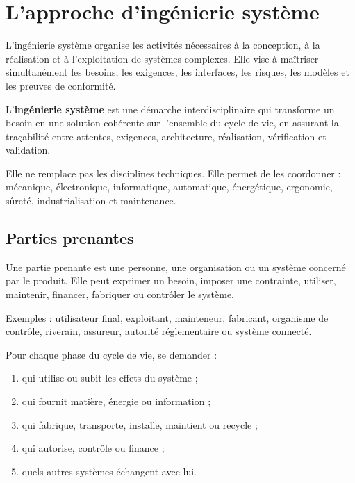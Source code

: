 
\section{L'approche d'ingénierie système}\label{sec:is-demarche}

L'ingénierie système organise les activités nécessaires à la conception, à la réalisation et à l'exploitation de systèmes complexes. Elle vise à maîtriser simultanément les besoins, les exigences, les interfaces, les risques, les modèles et les preuves de conformité.

\begin{ISdefinition}
L'\textbf{ingénierie système} est une démarche interdisciplinaire qui transforme un besoin en une solution cohérente sur l'ensemble du cycle de vie, en assurant la traçabilité entre attentes, exigences, architecture, réalisation, vérification et validation.
\end{ISdefinition}

Elle ne remplace pas les disciplines techniques. Elle permet de les coordonner : mécanique, électronique, informatique, automatique, énergétique, ergonomie, sûreté, industrialisation et maintenance.

\subsection{Parties prenantes}

Une partie prenante est une personne, une organisation ou un système concerné par le produit. Elle peut exprimer un besoin, imposer une contrainte, utiliser, maintenir, financer, fabriquer ou contrôler le système.

Exemples : utilisateur final, exploitant, mainteneur, fabricant, organisme de contrôle, riverain, assureur, autorité réglementaire ou système connecté.

\begin{ISmethode}[title={Identifier les parties prenantes}]
Pour chaque phase du cycle de vie, se demander :
\begin{enumerate}
  \item qui utilise ou subit les effets du système ;
  \item qui fournit matière, énergie ou information ;
  \item qui fabrique, transporte, installe, maintient ou recycle ;
  \item qui autorise, contrôle ou finance ;
  \item quels autres systèmes échangent avec lui.
\end{enumerate}
\end{ISmethode}

